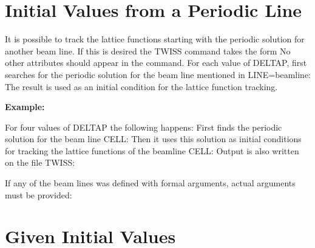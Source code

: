 
\section{Initial Values from a Periodic Line}
\label{sec:twissinitial}

It is possible to track the lattice functions starting with the periodic
solution for another beam line. If this is desired the TWISS command
takes the form  
No other attributes should appear in the command. For each value of
DELTAP, \madx first searches for the periodic solution for the beam line
mentioned in LINE=beamline: The result is used as an initial condition
for the lattice function tracking. 

\textbf{Example:} 

For four values of DELTAP the following happens: First \madx finds the
periodic solution for the beam line CELL: Then it uses this solution as
initial conditions for tracking the lattice functions of the beamline
CELL: Output is also written on the file TWISS:  

If any of the beam lines was defined with formal arguments, actual
arguments must be provided:  

\section{Given Initial Values}

